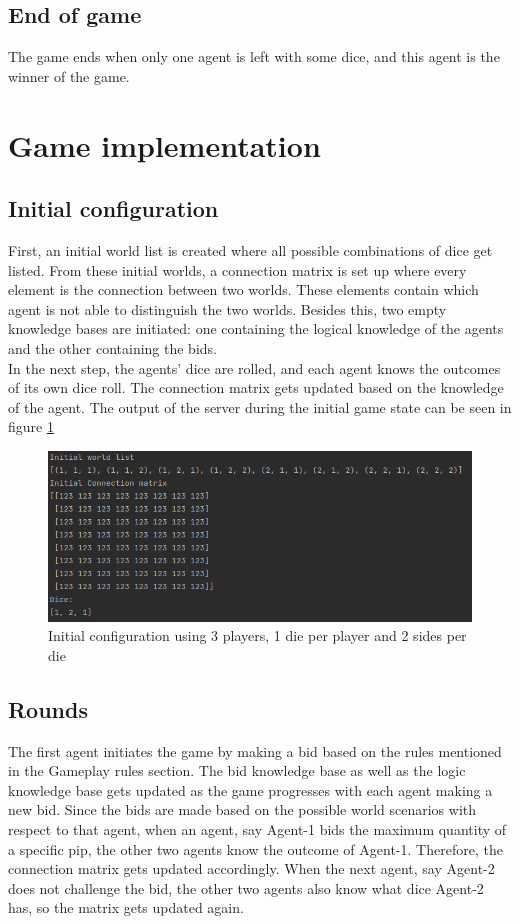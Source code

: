 \documentclass{article}
\begin{document}
\subsection*{End of game} %
The game ends when only one agent is left with some dice, and this agent is the winner of the game.

\section*{Game implementation}
\subsection*{Initial configuration}
First, an initial world list is created where all possible combinations of dice get listed. From these initial worlds, a connection matrix is set up where every element is the connection between two worlds. These elements contain which agent is not able to distinguish the two worlds. Besides this, two empty knowledge bases are initiated: one containing the logical knowledge of the agents and the other containing the bids.\\
In the next step, the agents’ dice are rolled, and each agent knows the outcomes of its own dice roll. The connection matrix gets updated based on the knowledge of the agent. The output of the server during the initial game state can be seen in figure \ref{fig:initc}
\begin{figure}[h!]
    \centering
    \includegraphics[width=\textwidth]{img/initialconfig.png}
    \caption{Initial configuration using 3 players, 1 die per player and 2 sides per die}
    \label{fig:initc}
\end{figure}
\subsection*{Rounds}
The first agent initiates the game by making a bid based on the rules mentioned in the Gameplay rules section. The bid knowledge base as well as the logic knowledge base gets updated as the game progresses with each agent making a new bid.  Since the bids are made based on the possible world scenarios with respect to that agent, when an agent, say Agent-1 bids the maximum quantity of a specific pip, the other two agents know the outcome of Agent-1. Therefore, the connection matrix gets updated accordingly. When the next agent, say Agent-2 does not challenge the bid,  the other two agents also know what dice Agent-2 has, so the matrix gets updated again.\\
\end{document}

